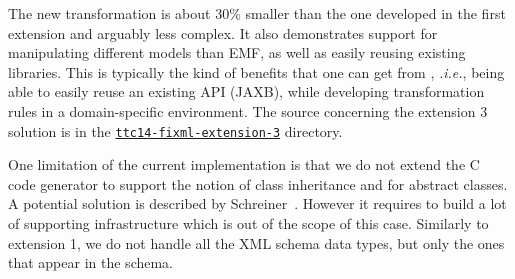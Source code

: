 The new transformation is about 30\% smaller than the one developed in the first extension and arguably less complex.
It also demonstrates \SIGMA support for manipulating different models than EMF, as well as easily reusing existing libraries.
This is typically the kind of benefits that one can get from \SIGMA, \textit{.i.e.}, being able to easily reuse an existing API (JAXB), while developing transformation rules in a domain-specific environment.
The source concerning the extension 3 solution is in the \href{https://github.com/fikovnik/ttc14-fixml-sigma/tree/master/ttc14-fixml-extension-3}{\texttt{ttc14-fixml-extension-3}} directory.

One limitation of the current implementation is that we do not extend the C code generator to support the notion of class inheritance and for abstract classes.
A potential solution is described by Schreiner~\cite{Schreiner1993}.
However it requires to build a lot of supporting infrastructure which is out of the scope of this \TTC case.
Similarly to extension 1, we do not handle all the XML schema data types, but only the ones that appear in the \FIXML schema.
